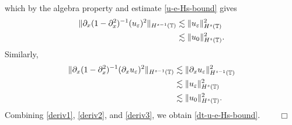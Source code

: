 		which by the algebra property and estimate \eqref{u-e-Hs-bound}
		gives
		\begin{equation}
			\begin{split}
				\label{deriv2}
				\|\partial_x (1-\partial_x^2)^{-1} (u_\varepsilon)^2\|_{H^{s-1}(\mathbb{T})}
				& \lesssim \|u_\varepsilon\|^2_{H^s(\mathbb{T})} 
				\\
				& \lesssim  \|u_0\|^2_{H^s(\mathbb{T})}.
			\end{split}
		\end{equation}
		Similarly,
		\begin{equation}
			\begin{split}
				\label{deriv3}
				\|\partial_x (1-\partial_x^2)^{-1} (\partial_x u_\varepsilon)^2\|_{H^{s-1}(\mathbb{T})}
				& \lesssim \|\partial_x u_\varepsilon\|^2_{H^{s-1}(\mathbb{T})} 
				\\
				& \lesssim  \|u_\varepsilon \|^2_{H^s(\mathbb{T})}
				\\
				& \lesssim \|u_0\|^2_{H^s(\mathbb{T})}.
			\end{split}
		\end{equation}
		Combining \eqref{deriv1}, \eqref{deriv2}, and \eqref{deriv3}, we
		obtain \eqref{dt-u-e-Hs-bound}. $\qquad \Box$

